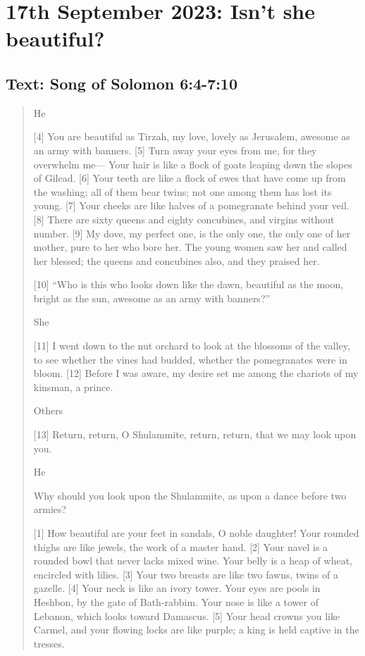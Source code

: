 \setcounter{figure}{0}

\section{17th September 2023: Isn't she beautiful?}
\subsection*{Text: Song of Solomon 6:4-7:10}
  \begin{quote}
    He

    [4] You are beautiful as Tirzah, my love,
        lovely as Jerusalem,
        awesome as an army with banners.
    [5] Turn away your eyes from me,
        for they overwhelm me—
    Your hair is like a flock of goats
        leaping down the slopes of Gilead.
    [6] Your teeth are like a flock of ewes
        that have come up from the washing;
    all of them bear twins;
        not one among them has lost its young.
    [7] Your cheeks are like halves of a pomegranate
        behind your veil.
    [8] There are sixty queens and eighty concubines,
        and virgins without number.
    [9] My dove, my perfect one, is the only one,
        the only one of her mother,
        pure to her who bore her.
    The young women saw her and called her blessed;
        the queens and concubines also, and they praised her.


    [10] “Who is this who looks down like the dawn,
        beautiful as the moon, bright as the sun,
        awesome as an army with banners?”


    She

    [11] I went down to the nut orchard
        to look at the blossoms of the valley,
    to see whether the vines had budded,
        whether the pomegranates were in bloom.
    [12] Before I was aware, my desire set me
        among the chariots of my kinsman, a prince.


    Others

    [13] Return, return, O Shulammite,
        return, return, that we may look upon you.


    He

    Why should you look upon the Shulammite,
        as upon a dance before two armies?


    [1] How beautiful are your feet in sandals,
        O noble daughter!
    Your rounded thighs are like jewels,
        the work of a master hand.
    [2] Your navel is a rounded bowl
        that never lacks mixed wine.
    Your belly is a heap of wheat,
        encircled with lilies.
    [3] Your two breasts are like two fawns,
        twins of a gazelle.
    [4] Your neck is like an ivory tower.
    Your eyes are pools in Heshbon,
        by the gate of Bath-rabbim.
    Your nose is like a tower of Lebanon,
        which looks toward Damascus.
    [5] Your head crowns you like Carmel,
        and your flowing locks are like purple;
        a king is held captive in the tresses.



\end{quote}
